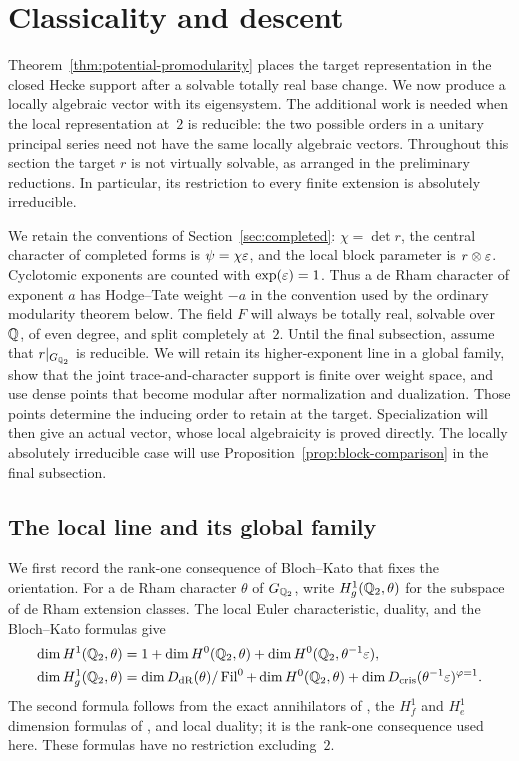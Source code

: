 \section{Classicality and descent}\label{sec:classicality}

Theorem~\ref{thm:potential-promodularity} places the target representation
in the closed Hecke support after a solvable totally real base change.
We now produce a locally algebraic vector with its eigensystem.
The additional work is needed when the local representation at~$2$ is
reducible: the two possible orders in a unitary principal series need
not have the same locally algebraic vectors.
Throughout this section the target $r$ is not virtually solvable, as
arranged in the preliminary reductions.  In particular, its restriction
to every finite extension is absolutely irreducible.

We retain the conventions of Section~\ref{sec:completed}:
$\chi=\det r$, the central character of completed forms is
$\psi=\chi\varepsilon$, and the local block parameter is $r\otimes\varepsilon$.
Cyclotomic exponents are counted with $\operatorname{exp}(\varepsilon)=1$.
Thus a de Rham character of exponent $a$ has Hodge--Tate weight $-a$
in the convention used by the ordinary modularity theorem below.
The field $F$ will always be totally real, solvable over~$\mathbb Q$, of even
degree, and split completely at~$2$.
Until the final subsection, assume that $r|_{G_{\mathbb Q_2}}$ is reducible.
We will retain its higher-exponent line in a global family, show that
the joint trace-and-character support is finite over weight space, and
use dense points that become modular after normalization and dualization.
Those points determine the inducing order to retain at the target.
Specialization will then give an actual vector, whose local algebraicity
is proved directly.  The locally absolutely irreducible case will use
Proposition~\ref{prop:block-comparison} in the final subsection.

\subsection{The local line and its global family}

We first record the rank-one consequence of Bloch--Kato that fixes the
orientation.  For a de Rham character $\theta$ of $G_{\mathbb Q_2}$, write
$H^1_g(\mathbb Q_2,\theta)$ for the subspace of de Rham extension classes.
The local Euler characteristic, duality, and the Bloch--Kato formulas give
\begin{align}
 \dim H^1(\mathbb Q_2,\theta)
 &=1+\dim H^0(\mathbb Q_2,\theta)
       +\dim H^0(\mathbb Q_2,\theta^{-1}\varepsilon),\label{eq:rank-one-euler}\\
 \dim H^1_g(\mathbb Q_2,\theta)
 &=\dim D_{\mathrm{dR}}(\theta)/\operatorname{Fil}^0
   +\dim H^0(\mathbb Q_2,\theta)
   +\dim D_{\mathrm{cris}}(\theta^{-1}\varepsilon)^{\varphi=1}.
   \label{eq:rank-one-geometric}
\end{align}
The second formula follows from the exact annihilators of
\cite[Proposition~3.8]{BlochKato1990}, the $H^1_f$ and $H^1_e$
dimension formulas of \cite[Corollary~3.8.4]{BlochKato1990}, and local
duality; it is the rank-one consequence used here.
These formulas have no restriction excluding~$2$.

